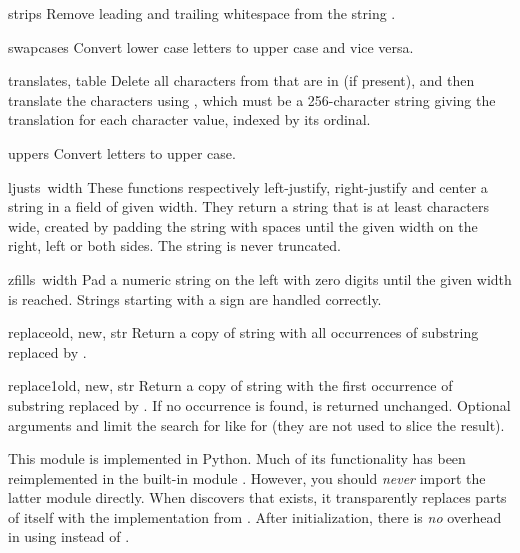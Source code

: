 \begin{funcdesc}{strip}{s}
Remove leading and trailing whitespace from the string .
\end{funcdesc}

\begin{funcdesc}{swapcase}{s}
Convert lower case letters to upper case and vice versa.
\end{funcdesc}

\begin{funcdesc}{translate}{s, table}
Delete all characters from  that are in  (if present), and 
then translate the characters using , which must be
a 256-character string giving the translation for each character
value, indexed by its ordinal.  
\end{funcdesc}

\begin{funcdesc}{upper}{s}
Convert letters to upper case.
\end{funcdesc}

\begin{funcdesc}{ljust}{s\, width}
These functions respectively left-justify, right-justify and center a
string in a field of given width.
They return a string that is at least
characters wide, created by padding the string
with spaces until the given width on the right, left or both sides.
The string is never truncated.
\end{funcdesc}

\begin{funcdesc}{zfill}{s\, width}
Pad a numeric string on the left with zero digits until the given
width is reached.  Strings starting with a sign are handled correctly.
\end{funcdesc}

\begin{funcdesc}{replace}{old, new, str}
Return a copy of string  with all occurrences of substring
 replaced by .
\end{funcdesc}

\begin{funcdesc}{replace1}{old, new, str}
Return a copy of string  with the first occurrence of
substring  replaced by .  If no occurrence is found,
 is returned unchanged.  Optional arguments  and
 limit the search for  like for  (they
are not used to slice the result).
\end{funcdesc}

This module is implemented in Python.  Much of its functionality has
been reimplemented in the built-in module .  However, you
should \emph{never} import the latter module directly.  When
 discovers that  exists, it transparently
replaces parts of itself with the implementation from .
After initialization, there is \emph{no} overhead in using
 instead of .
